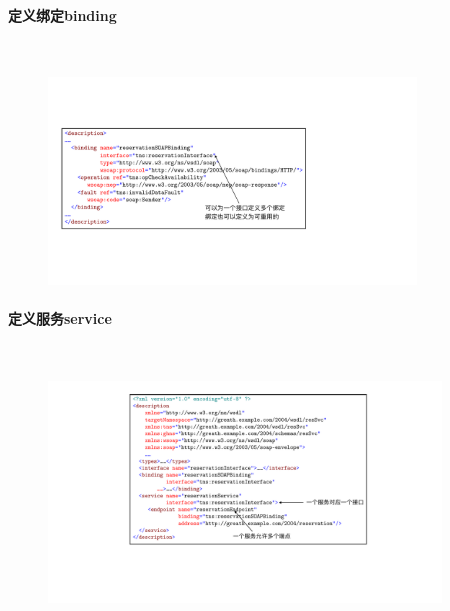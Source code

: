 \paragraph*{定义绑定binding}~{} \par
\begin{figure}[H]
    \vspace{-0.7em}
	\centering
	\includegraphics[width=0.87\textwidth]{images/定义绑定binding.pdf}
    \vspace{-1.5em}
\end{figure}

\paragraph*{定义服务service}~{} \par
\begin{figure}[H]
    \vspace{-0.7em}
	\centering
	\includegraphics[width=0.93\textwidth]{images/定义服务service.pdf}
    \vspace{-1.5em}
\end{figure}

